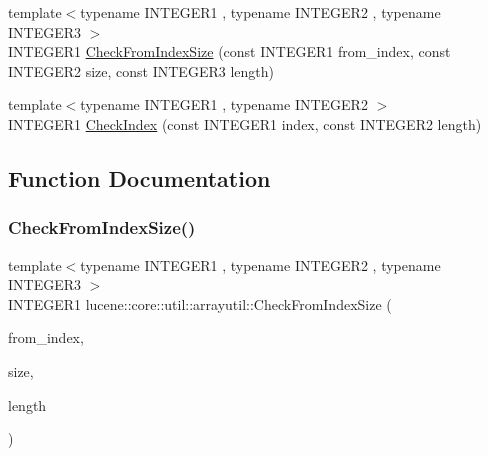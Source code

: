 \begin{DoxyCompactItemize}
\item 
{\footnotesize template$<$typename I\+N\+T\+E\+G\+E\+R1 , typename I\+N\+T\+E\+G\+E\+R2 , typename I\+N\+T\+E\+G\+E\+R3 $>$ }\\I\+N\+T\+E\+G\+E\+R1 \mbox{\hyperlink{namespacelucene_1_1core_1_1util_1_1arrayutil_ae747b6a73432eb1047e4bdde1b7ccc4a}{Check\+From\+Index\+Size}} (const I\+N\+T\+E\+G\+E\+R1 from\+\_\+index, const I\+N\+T\+E\+G\+E\+R2 size, const I\+N\+T\+E\+G\+E\+R3 length)
\item 
{\footnotesize template$<$typename I\+N\+T\+E\+G\+E\+R1 , typename I\+N\+T\+E\+G\+E\+R2 $>$ }\\I\+N\+T\+E\+G\+E\+R1 \mbox{\hyperlink{namespacelucene_1_1core_1_1util_1_1arrayutil_a0cd5572d14e7d2e96ae4a5d055267610}{Check\+Index}} (const I\+N\+T\+E\+G\+E\+R1 index, const I\+N\+T\+E\+G\+E\+R2 length)
\end{DoxyCompactItemize}


\subsection{Function Documentation}
\mbox{\label{namespacelucene_1_1core_1_1util_1_1arrayutil_ae747b6a73432eb1047e4bdde1b7ccc4a}} 
\subsubsection{\texorpdfstring{Check\+From\+Index\+Size()}{CheckFromIndexSize()}}
{\footnotesize\ttfamily template$<$typename I\+N\+T\+E\+G\+E\+R1 , typename I\+N\+T\+E\+G\+E\+R2 , typename I\+N\+T\+E\+G\+E\+R3 $>$ \\
I\+N\+T\+E\+G\+E\+R1 lucene\+::core\+::util\+::arrayutil\+::\+Check\+From\+Index\+Size (\begin{DoxyParamCaption}\item[{const I\+N\+T\+E\+G\+E\+R1}]{from\+\_\+index,  }\item[{const I\+N\+T\+E\+G\+E\+R2}]{size,  }\item[{const I\+N\+T\+E\+G\+E\+R3}]{length }\end{DoxyParamCaption})}

\mbox{\label{namespacelucene_1_1core_1_1util_1_1arrayutil_a18335a8c7e46732362ebbf7dedb060f9}} 
